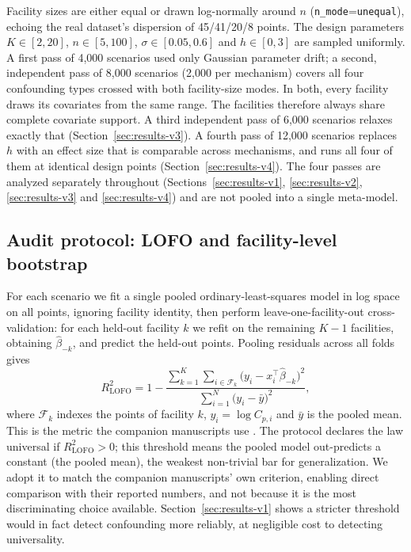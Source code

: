 \documentclass[journal=dce]{CUP-JNL-DTM}%
\begin{document}
Facility sizes are either equal or drawn log-normally around $n$ (\texttt{n\_mode}=\texttt{unequal}), echoing the real dataset's dispersion of 45/41/20/8 points. The design parameters $K\in[2,20]$, $n\in[5,100]$, $\sigma\in[0.05,0.6]$ and $h\in[0,3]$ are sampled uniformly. A first pass of 4,000 scenarios used only Gaussian parameter drift; a second, independent pass of 8,000 scenarios (2,000 per mechanism) covers all four confounding types crossed with both facility-size modes. In both, every facility draws its covariates from the same range. The facilities therefore always share complete covariate support. A third independent pass of 6,000 scenarios relaxes exactly that (Section~\ref{sec:results-v3}). A fourth pass of 12,000 scenarios replaces $h$ with an effect size that is comparable across mechanisms, and runs all four of them at identical design points (Section~\ref{sec:results-v4}). The four passes are analyzed separately throughout (Sections~\ref{sec:results-v1}, \ref{sec:results-v2}, \ref{sec:results-v3} and \ref{sec:results-v4}) and are not pooled into a single meta-model.

\subsection{Audit protocol: LOFO and facility-level bootstrap}

For each scenario we fit a single pooled ordinary-least-squares model in log space on all points, ignoring facility identity, then perform leave-one-facility-out cross-validation: for each held-out facility $k$ we refit on the remaining $K-1$ facilities, obtaining $\hat\beta_{-k}$, and predict the held-out points. Pooling residuals across all folds gives
\begin{equation}
R^{2}_{\mathrm{LOFO}}
= 1-\frac{\sum_{k=1}^{K}\sum_{i\in\mathcal{F}_k}\bigl(y_i-x_i^{\top}\hat\beta_{-k}\bigr)^{2}}
        {\sum_{i=1}^{N}\bigl(y_i-\bar{y}\bigr)^{2}},
\label{eq:lofo}
\end{equation}
where $\mathcal{F}_k$ indexes the points of facility $k$, $y_i=\log C_{p,i}$ and $\bar y$ is the pooled mean. This is the metric the companion manuscripts use \citep{gilruiz2026paper1,gilruiz2026paper2}. The protocol declares the law universal if $R^{2}_{\mathrm{LOFO}}>0$; this threshold means the pooled model out-predicts a constant (the pooled mean), the weakest non-trivial bar for generalization. We adopt it to match the companion manuscripts' own criterion, enabling direct comparison with their reported numbers, and not because it is the most discriminating choice available. Section~\ref{sec:results-v1} shows a stricter threshold would in fact detect confounding more reliably, at negligible cost to detecting universality.
\end{document}
